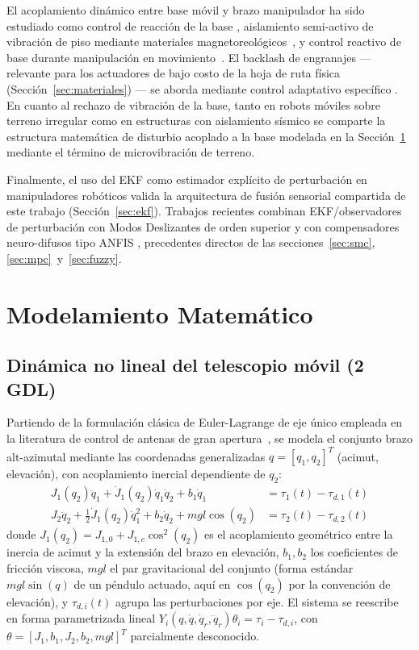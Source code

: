 \documentclass[journal]{IEEEtran}
\begin{document}
El acoplamiento dinámico entre base móvil y brazo manipulador ha sido
estudiado como control de reacción de la base
\cite{aadeca2018stabilization}, aislamiento semi-activo de vibración de
piso mediante materiales magnetoreológicos~\cite{zhu2025enhanced}, y
control reactivo de base durante manipulación en
movimiento~\cite{burgesslimerick2024reactive}. El backlash de engranajes
--- relevante para los actuadores de bajo costo de la hoja de ruta física
(Sección~\ref{sec:materiales}) --- se aborda mediante control adaptativo
específico \cite{tomizuka1995antibacklash,abhari2019adaptive}. En cuanto
al rechazo de vibración de la base, tanto en robots móviles sobre terreno
irregular \cite{guo2023closedloop} como en estructuras con aislamiento
sísmico \cite{subasri2014discrete} se comparte la estructura matemática
de disturbio acoplado a la base modelada en la
Sección~\ref{sec:modelo} mediante el término de microvibración de terreno.

Finalmente, el uso del EKF como estimador explícito de perturbación en
manipuladores robóticos \cite{agarwal2016disturbance} valida la
arquitectura de fusión sensorial compartida de este trabajo
(Sección~\ref{sec:ekf}). Trabajos recientes combinan EKF/observadores de
perturbación con Modos Deslizantes de orden superior
\cite{ntsm2025processes} y con compensadores neuro-difusos tipo ANFIS
\cite{anfis2012procedia}, precedentes directos de las
secciones~\ref{sec:smc}, \ref{sec:mpc}~y~\ref{sec:fuzzy}.

\section{Modelamiento Matemático}
\label{sec:modelo}

\subsection{Dinámica no lineal del telescopio móvil (2 GDL)}
Partiendo de la formulación clásica de Euler-Lagrange de eje único
empleada en la literatura de control de antenas de gran apertura~\cite{gawronski2008modeling},
se modela el conjunto brazo alt-azimutal
mediante las coordenadas generalizadas $q = [q_1, q_2]^T$ (acimut,
elevación), con acoplamiento inercial dependiente de $q_2$:
\begin{align}
J_1(q_2)\ddot{q}_1 + \dot{J}_1(q_2)\dot{q}_1\dot{q}_2 + b_1\dot{q}_1 &= \tau_1(t) - \tau_{d,1}(t) \label{eq:az}\\
J_2\ddot{q}_2 + \tfrac{1}{2}\dot{J}_1(q_2)\dot{q}_1^2 + b_2\dot{q}_2 + mgl\cos(q_2) &= \tau_2(t) - \tau_{d,2}(t) \label{eq:el}
\end{align}
donde $J_1(q_2) = J_{1,0} + J_{1,c}\cos^2(q_2)$ es el acoplamiento
geométrico entre la inercia de acimut y la extensión del brazo en
elevación, $b_1,b_2$ los coeficientes de fricción viscosa, $mgl$ el par
gravitacional del conjunto (forma estándar $mgl\sin(q)$ de un péndulo
actuado, aquí en $\cos(q_2)$ por la convención de elevación), y
$\tau_{d,i}(t)$ agrupa las perturbaciones por eje. El sistema se reescribe
en forma parametrizada lineal $Y_i(q,\dot q, \dot q_r, \ddot
q_r)\theta_i = \tau_i - \tau_{d,i}$, con $\theta = [J_1, b_1, J_2, b_2,
mgl]^T$ parcialmente desconocido.
\end{document}
